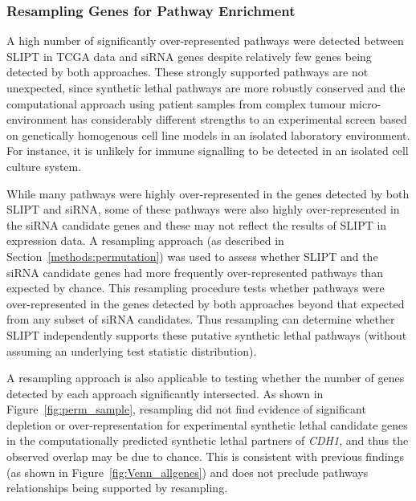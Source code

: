 
\FloatBarrier

\subsubsection{Resampling Genes for Pathway Enrichment} \label{chapt3:compare_pathway_perm}

A high number of significantly over-represented \glspl{pathway} were detected between \gls{SLIPT} in \gls{TCGA}  data and \gls{siRNA} genes despite relatively few genes being detected by both approaches. These strongly supported \glspl{pathway} are not unexpected, since \gls{synthetic lethal} \glspl{pathway} are more robustly conserved \citep{Dixon2008} and the computational approach using patient samples from complex tumour micro-environment has considerably different strengths to an experimental screen \citep{Telford2015} based on genetically homogenous cell line models in an isolated laboratory environment. For instance, it is unlikely for immune signalling to be detected in an isolated cell culture system.

While many \glspl{pathway} were highly over-represented in the genes detected by both \gls{SLIPT} and \gls{siRNA}, some of these \glspl{pathway} were also highly over-represented in the \gls{siRNA} candidate genes and these may not reflect the results of \gls{SLIPT} in expression data. A resampling approach (as described in Section~\ref{methods:permutation}) was used to assess whether \gls{SLIPT} and the \gls{siRNA} candidate genes had more frequently over-represented \glspl{pathway} than expected by chance. This resampling procedure tests whether \glspl{pathway} were over-represented in the genes detected by both approaches beyond that expected from any subset of \gls{siRNA} candidates. Thus resampling can determine whether \gls{SLIPT} independently supports these putative \gls{synthetic lethal} \glspl{pathway} (without assuming an underlying test statistic distribution).

A resampling approach is also applicable to testing whether the number of genes detected by each approach significantly intersected. As shown in Figure~\ref{fig:perm_sample}, resampling did not find evidence of significant depletion or over-represent\-ation for experimental \gls{synthetic lethal} candidate genes in the computationally predicted \gls{synthetic lethal} partners of \textit{CDH1}, and thus the observed overlap may be due to chance. This is consistent with previous findings (as shown in Figure~\ref{fig:Venn_allgenes}) and does not preclude \glspl{pathway} relationships being supported by resampling.

